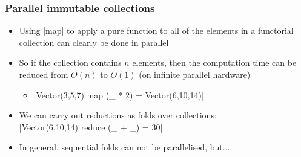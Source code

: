 \documentclass[mathserif,handout]{beamer}
\begin{document}

\begin{frame}[fragile]
  \frametitle{Parallel immutable collections}
  \begin{itemize}
  \item Using |map| to apply a \alert{pure} function to all of the elements in a functorial collection can clearly be done in parallel
  \item So if the collection contains $n$ elements, then the computation time can be reduced from $O(n)$ to $O(1)$ (on infinite parallel hardware)
    \begin{itemize}
    \item |Vector(3,5,7) map (_ * 2) = Vector(6,10,14)|
    \end{itemize}
    \item We can carry out \alert{reductions} as \alert{folds} over collections:\\
      |Vector(6,10,14) reduce (_ + _) = 30|
      \item In general, sequential folds can not be parallelised, but...
  \end{itemize}
\end{frame}
\end{document}
